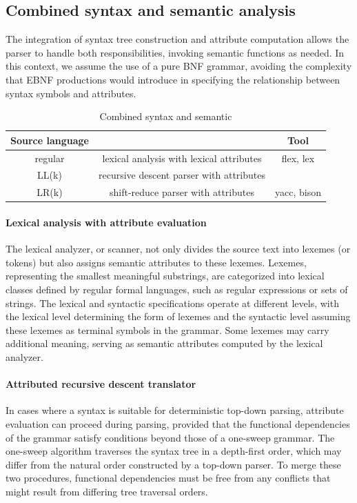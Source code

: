 \subsection{Combined syntax and semantic analysis}
The integration of syntax tree construction and attribute computation allows the parser to handle both responsibilities, invoking semantic functions as needed. 
In this context, we assume the use of a pure BNF grammar, avoiding the complexity that EBNF productions would introduce in specifying the relationship between syntax symbols and attributes.
\begin{table}[H]
    \centering
    \begin{tabular}{c|c|c}
        \textbf{Source language}  &                                                   & \textbf{Tool}         \\ \hline
        regular                   & lexical analysis with lexical attributes          & flex, lex             \\
        LL(k)                     & recursive descent parser with attributes          &                       \\
        LR(k)                     & shift-reduce parser with attributes               & yacc, bison
    \end{tabular}
    \caption{Combined syntax and semantic}
\end{table}

\paragraph*{Lexical analysis with attribute evaluation}
The lexical analyzer, or scanner, not only divides the source text into lexemes (or tokens) but also assigns semantic attributes to these lexemes. 
Lexemes, representing the smallest meaningful substrings, are categorized into lexical classes defined by regular formal languages, such as regular expressions or sets of strings. 
The lexical and syntactic specifications operate at different levels, with the lexical level determining the form of lexemes and the syntactic level assuming these lexemes as terminal symbols in the grammar.
Some lexemes may carry additional meaning, serving as semantic attributes computed by the lexical analyzer.

\paragraph*{Attributed recursive descent translator}
In cases where a syntax is suitable for deterministic top-down parsing, attribute evaluation can proceed during parsing, provided that the functional dependencies of the grammar satisfy conditions beyond those of a one-sweep grammar. 
The one-sweep algorithm traverses the syntax tree in a depth-first order, which may differ from the natural order constructed by a top-down parser. 
To merge these two procedures, functional dependencies must be free from any conflicts that might result from differing tree traversal orders.

